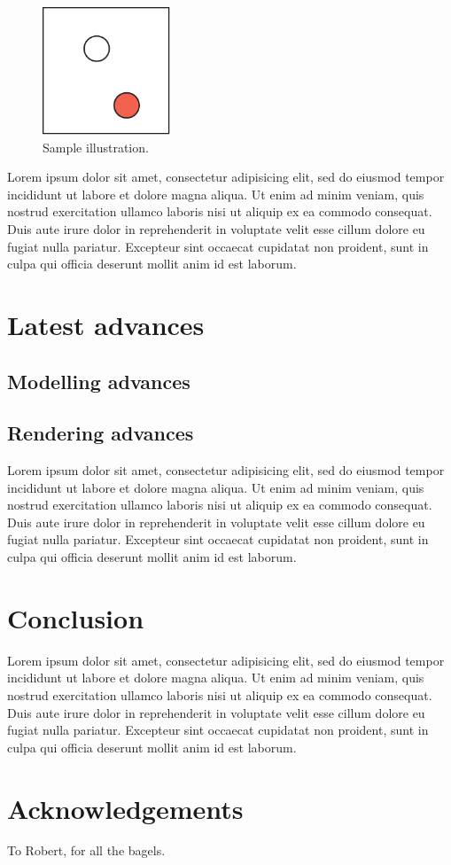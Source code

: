 \documentclass[conference]{acmsiggraph}
\begin{document}
\begin{figure}[ht]
  \centering
  \includegraphics[width=1.5in]{images/samplefigure}
  \caption{Sample illustration.}
\end{figure}
Lorem ipsum dolor sit amet, consectetur adipisicing elit, sed do
eiusmod tempor incididunt ut labore et dolore magna aliqua. Ut enim ad
minim veniam, quis nostrud exercitation ullamco laboris nisi ut
aliquip ex ea commodo consequat. Duis aute irure dolor in
reprehenderit in voluptate velit esse cillum dolore eu fugiat nulla
pariatur. Excepteur sint occaecat cupidatat non proident, sunt in
culpa qui officia deserunt mollit anim id est laborum.

\section{Latest advances}

\subsection{Modelling advances}

\subsection{Rendering advances}

Lorem ipsum dolor sit amet, consectetur adipisicing elit, sed do
eiusmod tempor incididunt ut labore et dolore magna aliqua. Ut enim ad
minim veniam, quis nostrud exercitation ullamco laboris nisi ut
aliquip ex ea commodo consequat. Duis aute irure dolor in
reprehenderit in voluptate velit esse cillum dolore eu fugiat nulla
pariatur. Excepteur sint occaecat cupidatat non proident, sunt in
culpa qui officia deserunt mollit anim id est laborum.

\section{Conclusion}

Lorem ipsum dolor sit amet, consectetur adipisicing elit, sed do
eiusmod tempor incididunt ut labore et dolore magna aliqua. Ut enim ad
minim veniam, quis nostrud exercitation ullamco laboris nisi ut
aliquip ex ea commodo consequat. Duis aute irure dolor in
reprehenderit in voluptate velit esse cillum dolore eu fugiat nulla
pariatur. Excepteur sint occaecat cupidatat non proident, sunt in
culpa qui officia deserunt mollit anim id est laborum.

\section*{Acknowledgements}

To Robert, for all the bagels.



\end{document}
